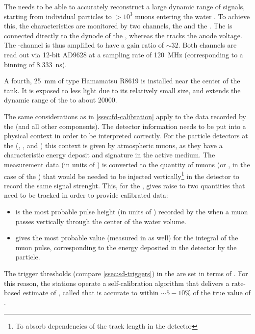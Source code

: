The \WCD needs to be able to accurately reconstruct a large dynamic range of
signals, starting from individual particles to $>10^3$ muons entering the water
\cite{abrahamTriggerApertureSurface2010}. To achieve this, the \LPMTs 
characteristics are monitored by two channels, the \HG and the \LG. The \LG 
is connected directly to the dynode of the \PMTs, whereas the \HG tracks the 
anode voltage. The \HG-channel is thus amplified to have a gain ratio of 
$\sim32$. Both channels are read out via 12-bit AD9628 \FADCs 
\cite{analogdevicesinc.AD9628DatasheetProduct2015} at a sampling rate of \SI{120}{\mega\hertz} (corresponding to a binning of \SI{8.333}{\nano\second}). 

A fourth, \SI{25}{\milli\meter} \SPMT of type Hamamatsu R8619 
\cite{hamamatsuphotonicsPhotomultiplierTubeR8619} is installed near the center
of the tank. It is exposed to less light due to its relatively small size, and 
extends the dynamic range of the \WCD to about \SI{20000}{\VEM}.

The same considerations as in \cref{ssec:fd-calibration} apply to the data
recorded by the \WCD (and all other \SD components). The detector information 
needs to be put into a physical context in order to be interpreted correctly.
For the particle detectors at the \PAO (\WCD, \SSD, and \UMD) this context is 
given by atmospheric muons, as they have a characteristic energy deposit and 
signature in the active medium. The measurement data (in units of \ADC) is
converted to the quantity of muons (or \MIPs, in the case of the \SSD) that
would be needed to be injected vertically\footnote{To absorb dependencies of the
track length in the detector} in the detector to record the same signal 
strenght. This, for the \WCD, gives raise to two quantities that need to be 
tracked in order to provide calibrated data:

\begin{itemize}
	\item \Ivem is the most probable pulse height (in units of \ADC) 
	recorded by the \WCD \PMTs when a muon passes vertically through the 
	center of the water volume.
	\item \Qvem gives the most probable value (measured in \ADC as well) for
	the integral of the muon pulse, corresponding to the energy deposited in 	the detector by the particle.
\end{itemize}

The trigger thresholds (compare \cref{ssec:sd-triggers}) in the \WCD are set in
terms of \Ivem. For this reason, the stations operate a self-calibration
algorithm that delivers a rate-based estimate of \Ivem, called \VemOnline that 
is accurate to within $\sim5-10\%$ \cite{bertouCalibrationSurfaceArray2006} of 
the true value of \Ivem.

